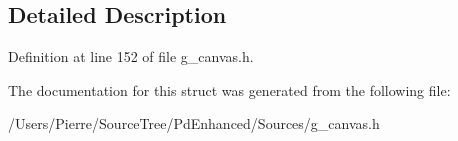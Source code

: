 \subsection{Detailed Description}


Definition at line 152 of file g\-\_\-canvas.\-h.



The documentation for this struct was generated from the following file\-:\begin{DoxyCompactItemize}
\item 
/\-Users/\-Pierre/\-Source\-Tree/\-Pd\-Enhanced/\-Sources/g\-\_\-canvas.\-h\end{DoxyCompactItemize}
